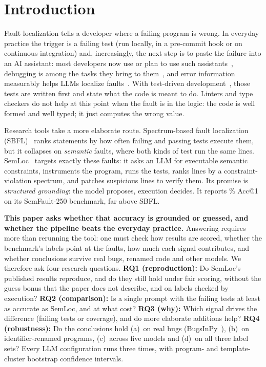 \section{Introduction}
\label{sec:intro}

Fault localization tells a developer where a failing program is wrong. In everyday practice the trigger is a failing
test (run locally, in a pre-commit hook or on continuous integration) and, increasingly, the next step is to paste the
failure into an AI assistant: most developers now use or plan to use such assistants~\cite{stackoverflow2025,jetbrains2025},
debugging is among the tasks they bring to them~\cite{xiao2024devgpt}, and error information measurably helps LLMs
localize faults~\cite{wu2023llmfl}. With test-driven development~\cite{beck2003tdd}, those tests are
written first and state what the code is meant to do. Linters and type checkers do not help at this point when the fault
is in the logic: the code is well formed and well typed; it just computes the wrong value.

Research tools take a more elaborate route. Spectrum-based fault localization
(SBFL)~\cite{jones2002,abreu2009,wong2016survey} ranks statements by how often failing and passing tests execute them,
but it collapses on \emph{semantic} faults, where both kinds of test run the same lines. SemLoc~\cite{yang2026semloc}
targets exactly these faults: it asks an LLM for executable semantic constraints, instruments the program, runs the tests,
ranks lines by a constraint-violation spectrum, and patches suspicious lines to verify them. Its promise is
\emph{structured grounding}: the model proposes, execution decides. It reports \RqOneSemlocClaudeTZeroEightAuthorAllAccOne\%
Acc@1 on its SemFault-250 benchmark, far above SBFL.

\textbf{This paper asks whether that accuracy is grounded or guessed, and whether the pipeline beats the everyday
practice.} Answering requires more than rerunning the tool: one must check how results are scored, whether the
benchmark's labels point at the faults, how much each signal contributes, and whether conclusions survive real bugs,
renamed code and other models. We therefore ask four research questions.
\textbf{RQ1 (reproduction):} Do SemLoc's published results reproduce, and do they still hold under fair scoring, without
the guess bonus that the paper does not describe, and on labels checked by execution?
\textbf{RQ2 (comparison):} Is a single prompt with the failing tests at least as accurate as SemLoc, and at what cost?
\textbf{RQ3 (why):} Which signal drives the difference (failing tests or coverage), and do more elaborate additions help?
\textbf{RQ4 (robustness):} Do the conclusions hold (a)~on real bugs (BugsInPy~\cite{widyasari2020}), (b)~on identifier-renamed
programs, (c)~across five models and (d)~on all three label sets? Every LLM configuration runs three times, with program- and template-cluster bootstrap confidence intervals.

